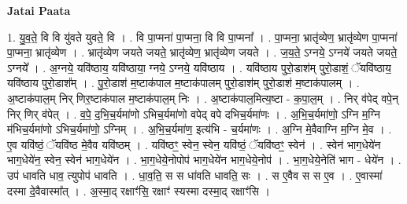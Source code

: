 \documentclass[17pt]{extarticle}
\begin{document}
\textbf{Jatai Paata} \newline

1. यु॒व॒ते॒ वि वि यु॑वते युवते॒ वि । . वि पा॒प्मना॑ पा॒प्मना॒ वि वि पा॒प्मना᳚ । . पा॒प्मना॒ भ्रातृ॑व्येण॒ भ्रातृ॑व्येण पा॒प्मना॑ पा॒प्मना॒ भ्रातृ॑व्येण । . भ्रातृ॑व्येण जयते जयते॒ भ्रातृ॑व्येण॒ भ्रातृ॑व्येण जयते । . ज॒य॒ते॒ ऽग्नये॒ ऽग्नये॑ जयते जयते॒ ऽग्नये᳚ । . अ॒ग्नये॒ यवि॑ष्ठाय॒ यवि॑ष्ठाया॒ ग्नये॒ ऽग्नये॒ यवि॑ष्ठाय । . यवि॑ष्ठाय पुरो॒डाश॑म् पुरो॒डाशं॒ ॅयवि॑ष्ठाय॒ यवि॑ष्ठाय पुरो॒डाश᳚म् । . पु॒रो॒डाश॑ म॒ष्टाक॑पाल म॒ष्टाक॑पालम् पुरो॒डाश॑म् पुरो॒डाश॑ म॒ष्टाक॑पालम् । . अ॒ष्टाक॑पाल॒म् निर् णिर॒ष्टाक॑पाल म॒ष्टाक॑पाल॒म् निः । . अ॒ष्टाक॑पाल॒मित्य॒ष्टा - क॒पा॒ल॒म् । . निर् व॑पेद् वपे॒न् निर् णिर् व॑पेत् । . व॒पे॒ द॒भि॒च॒र्यमा॑णो ऽभिच॒र्यमा॑णो वपेद् वपे दभिच॒र्यमा॑णः । . अ॒भि॒च॒र्यमा॑णो॒ ऽग्नि म॒ग्नि म॑भिच॒र्यमा॑णो ऽभिच॒र्यमा॑णो॒ ऽग्निम् । . अ॒भि॒च॒र्यमा॑ण॒ इत्य॑भि - च॒र्यमा॑णः । . अ॒ग्नि मे॒वैवाग्नि म॒ग्नि मे॒व । . ए॒व यवि॑ष्ठं॒ ॅयवि॑ष्ठ मे॒वैव यवि॑ष्ठम् । . यवि॑ष्ठꣳ॒॒ स्वेन॒ स्वेन॒ यवि॑ष्ठं॒ ॅयवि॑ष्ठꣳ॒॒ स्वेन॑ । . स्वेन॑ भाग॒धेये॑न भाग॒धेये॑न॒ स्वेन॒ स्वेन॑ भाग॒धेये॑न । . भा॒ग॒धेये॒नोपोप॑ भाग॒धेये॑न भाग॒धेये॒नोप॑ । . भा॒ग॒धेये॒नेति॑ भाग - धेये॑न । . उप॑ धावति धाव॒ त्युपोप॑ धावति । . धा॒व॒ति॒ स स धा॑वति धावति॒ सः । . स ए॒वैव स स ए॒व । . ए॒वास्मा॑ दस्मा दे॒वैवास्मा᳚त् । . अ॒स्मा॒द् रक्षाꣳ॑सि॒ रक्षाꣳ॑ स्यस्मा दस्मा॒द् रक्षाꣳ॑सि । \newline
\end{document}

